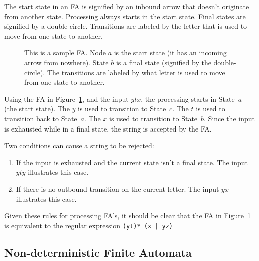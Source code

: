 \documentclass[letterpaper,12pt,openany,reqno]{book}%
\newcommand{\faterminalnode}[3] {\draw (#1) circle [radius=9pt]; \node at (#1) (#2) [circle, draw, minimum size=24pt] {#2};}
\newcommand{\fastart}[1] {\coordinate (start) at (#1);}
\newcommand{\fanonterminalnode}[2] {\node at (#1) (#2) [circle, draw, minimum size=24pt] {#2};}
\newcommand{\fatransition}[3] {\draw [-{Latex[length=3mm,width=2.5mm]}] (#1) -- (#2) node [midway, above] {#3};}
\newcommand{\faarctransition}[5] {\draw [-{Latex[length=3mm,width=2.5mm]}] (#1) to[out=#4, in=#5] node  [midway, above] {#3} (#2) ;}
\begin{document}
The start state in an FA is signified by an inbound arrow that doesn't originate from another state. Processing always starts in the start state. Final states are signified by a double circle. Transitions are labeled by the letter that is used to move from one state to another. 

\begin{figure}[hbt]
\centering
{}
 \caption[Sample Finite Automaton]{This is a sample FA. Node $a$ is the start state (it has an incoming arrow from nowhere). State $b$ is a final state (signified by the double-circle). The transitions are labeled by what letter is used to move from one state to another.}
  \label{F.FA_1}
\end{figure}

Using the FA in Figure~\ref{F.FA_1}, and the input $ytx$, the processing starts in State~$a$ (the start state). The $y$ is used to transition to State~$c$. The $t$ is used to transition back to State~$a$. The $x$ is used to transition to State~$b$. Since the input is exhausted while in a final state, the string is accepted by the FA.

Two conditions can cause a string to be rejected: 
\begin{enumerate}
\item If the input is exhausted and the current state isn't a final state. The input $yty$ illustrates this case.
\item If there is no outbound transition on the current letter. The input $yx$ illustrates this case.
\end{enumerate}

Given these rules for processing FA's, it should be clear that the FA in Figure~\ref{F.FA_1} is equivalent to the regular expression \texttt{(yt)* (x | yz)}

\subsection{Non-deterministic Finite Automata}
\end{document}
